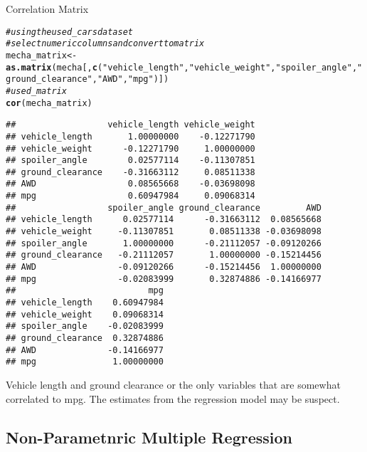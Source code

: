 \documentclass[a4paper, 12pt]{article}\usepackage[]{graphicx}\usepackage[]{color}
\makeatletter
\newcommand{\hlstr}[1]{\textcolor[rgb]{0.192,0.494,0.8}{#1}}%
\newcommand{\hlcom}[1]{\textcolor[rgb]{0.678,0.584,0.686}{\textit{#1}}}%
\newcommand{\hlstd}[1]{\textcolor[rgb]{0.345,0.345,0.345}{#1}}%
\newcommand{\hlkwb}[1]{\textcolor[rgb]{0.69,0.353,0.396}{#1}}%
\newcommand{\hlkwd}[1]{\textcolor[rgb]{0.737,0.353,0.396}{\textbf{#1}}}%
\newenvironment{kframe}{%
 \def\at@end@of@kframe{}%
 \ifinner\ifhmode%
  \def\at@end@of@kframe{\end{minipage}}%
  \begin{minipage}{\columnwidth}%
 \fi\fi%
 \def\FrameCommand##1{\hskip\@totalleftmargin \hskip-\fboxsep
 \colorbox{shadecolor}{##1}\hskip-\fboxsep
     \hskip-\linewidth \hskip-\@totalleftmargin \hskip\columnwidth}%
 \MakeFramed {\advance\hsize-\width
   \@totalleftmargin\z@ \linewidth\hsize
   \@setminipage}}%
 {\par\unskip\endMakeFramed%
 \at@end@of@kframe}
\newenvironment{knitrout}{}{} %
\makeatother
\begin{document}
Correlation Matrix
\begin{knitrout}
\color{fgcolor}\begin{kframe}
\begin{alltt}
\hlcom{# using the used_cars data set }
\hlcom{# select numeric columns and convert to matrix}
\hlstd{mecha_matrix} \hlkwb{<-} \hlkwd{as.matrix}\hlstd{(mecha[,}\hlkwd{c}\hlstd{(}\hlstr{"vehicle_length"}\hlstd{,}\hlstr{"vehicle_weight"}\hlstd{,}\hlstr{"spoiler_angle"}\hlstd{,} \hlstr{"ground_clearance"}\hlstd{,} \hlstr{"AWD"}\hlstd{,} \hlstr{"mpg"}\hlstd{)])}
\hlcom{#used_matrix}
\hlkwd{cor}\hlstd{(mecha_matrix)}
\end{alltt}
\begin{verbatim}
##                  vehicle_length vehicle_weight
## vehicle_length       1.00000000    -0.12271790
## vehicle_weight      -0.12271790     1.00000000
## spoiler_angle        0.02577114    -0.11307851
## ground_clearance    -0.31663112     0.08511338
## AWD                  0.08565668    -0.03698098
## mpg                  0.60947984     0.09068314
##                  spoiler_angle ground_clearance         AWD
## vehicle_length      0.02577114      -0.31663112  0.08565668
## vehicle_weight     -0.11307851       0.08511338 -0.03698098
## spoiler_angle       1.00000000      -0.21112057 -0.09120266
## ground_clearance   -0.21112057       1.00000000 -0.15214456
## AWD                -0.09120266      -0.15214456  1.00000000
## mpg                -0.02083999       0.32874886 -0.14166977
##                          mpg
## vehicle_length    0.60947984
## vehicle_weight    0.09068314
## spoiler_angle    -0.02083999
## ground_clearance  0.32874886
## AWD              -0.14166977
## mpg               1.00000000
\end{verbatim}
\end{kframe}
\end{knitrout}
Vehicle length and ground clearance or the only variables that are somewhat correlated to mpg. The estimates from the regression model may be suspect. 


\subsection{Non-Parametnric Multiple Regression}
\end{document}
